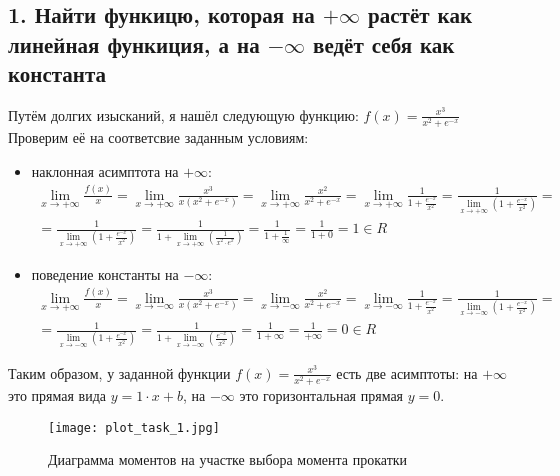 \documentclass{article}
\begin{document}
	\subsection*{1. Найти функицю, которая на $+ \infty$ растёт как линейная функиция, а на $- \infty$ ведёт себя как константа}
	Путём долгих изысканий, я нашёл следующую функцию:
	$f(x) = \frac{x^3}{x^2 + e^{-x}}$
	\\
	Проверим её на соответсвие заданным условиям:
	\begin{itemize}
		\item 	наклонная асимптота на $+ \infty$:
		\begin{gather*}
			\lim_{x\to + \infty} \frac{f(x)}{x} = \lim_{x\to + \infty} \frac{x^3}{x(x^2 + e^{-x})}=\lim_{x\to + \infty} \frac{x^2}{x^2 + e^{-x}}=\lim_{x\to + \infty} \frac{1}{1 + \frac {e^{-x}}{x^2}}=\frac{1}{\lim_{x\to + \infty} \left( 1 + \frac {e^{-x}}{x^2}\right) } =\nonumber \\ =\frac{1}{\lim_{x\to + \infty} \left( 1 + \frac {e^{-x}}{x^2}\right) } = \frac{1}{1 + \lim_{x\to + \infty} \left(\frac {1}{x^2 \cdot e^{x}}\right) } = \frac{1}{1 + \frac{1}{\infty} } = \frac{1}{1 + 0} = 1 \in R
			\end{gather*}
				\item 	поведение константы на $- \infty$:
			\begin{gather*}
			\lim_{x\to + \infty} \frac{f(x)}{x} = \lim_{x\to - \infty} \frac{x^3}{x(x^2 + e^{-x})}=\lim_{x\to - \infty} \frac{x^2}{x^2 + e^{-x}}=\lim_{x\to - \infty} \frac{1}{1 + \frac {e^{-x}}{x^2}}=\frac{1}{\lim_{x\to - \infty} \left( 1 + \frac {e^{-x}}{x^2}\right) } =\nonumber \\ =\frac{1}{\lim_{x\to - \infty} \left( 1 + \frac {e^{-x}}{x^2}\right) } = \frac{1}{1 + \lim_{x\to - \infty}\left( \frac {e^{-x}}{x^2}\right) } = \frac{1}{1 + \infty } = \frac{1}{+\infty} = 0 \in R
			\end{gather*}
	\end{itemize}
	Таким образом, у заданной функции $f(x) = \frac{x^3}{x^2 + e^{-x}}$ есть две асимптоты: на $+\infty$ это прямая вида $y = 1 \cdot x + b$, на $-\infty$ это горизонтальная прямая $y = 0$.
	\begin{figure}[h]
		\centering
		\texttt{[image: plot\_task\_1.jpg]}
		
		\caption{Диаграмма моментов на участке выбора момента прокатки}
		
		\label{fig:mpr}
		
	\end{figure}
\end{document}
